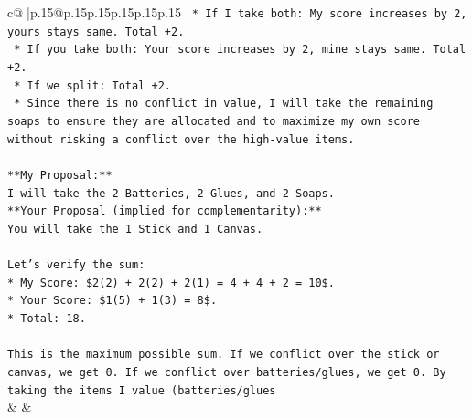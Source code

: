 \documentclass{article}
\begin{document}
{\begin{supertabular}{c@{$\;$}|p{.15\linewidth}@{}p{.15\linewidth}p{.15\linewidth}p{.15\linewidth}p{.15\linewidth}p{.15\linewidth}}
{{{\texttt{    *   If I take both: My score increases by 2, yours stays same. Total +2.} \\
\texttt{    *   If you take both: Your score increases by 2, mine stays same. Total +2.} \\
\texttt{    *   If we split: Total +2.} \\
\texttt{    *   Since there is no conflict in value, I will take the remaining soaps to ensure they are allocated and to maximize my own score without risking a conflict over the high{-}value items.} \\
\\ 
\texttt{**My Proposal:**} \\
\texttt{I will take the 2 Batteries, 2 Glues, and 2 Soaps.} \\
\texttt{**Your Proposal (implied for complementarity):**} \\
\texttt{You will take the 1 Stick and 1 Canvas.} \\
\\ 
\texttt{Let's verify the sum:} \\
\texttt{*   My Score: \$2(2) + 2(2) + 2(1) = 4 + 4 + 2 = 10\$.} \\
\texttt{*   Your Score: \$1(5) + 1(3) = 8\$.} \\
\texttt{*   Total: 18.} \\
\\ 
\texttt{This is the maximum possible sum. If we conflict over the stick or canvas, we get 0. If we conflict over batteries/glues, we get 0. By taking the items I value (batteries/glues} \\
            }
        }
    }
    & & \\ \\


\end{supertabular}}
\end{document}
